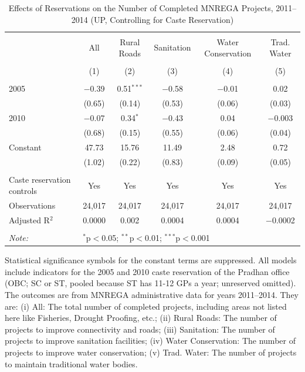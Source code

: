 \begin{table}[!htbp]
\centering
\begin{threeparttable}

  \caption{Effects of Reservations on the Number of Completed MNREGA Projects, 2011--2014 (UP, Controlling for Caste Reservation)} 
  \label{main_mnrega_up_2005_2010_caste_ctrl} 
\scriptsize 
\begin{tabular}{@{\extracolsep{0pt}}lccccc} 
\\[-1.8ex]\hline 
\hline \\[-1.8ex] 
 & All & Rural Roads & Sanitation & Water Conservation & Trad. Water \\ 
\\[-1.8ex] & (1) & (2) & (3) & (4) & (5)\\ 
\hline \\[-1.8ex] 
 2005 & $-$0.39 & 0.51$^{***}$ & $-$0.58 & $-$0.01 & 0.02 \\ 
  & (0.65) & (0.14) & (0.53) & (0.06) & (0.03) \\ 
  2010 & $-$0.07 & 0.34$^{*}$ & $-$0.43 & 0.04 & $-$0.003 \\ 
  & (0.68) & (0.15) & (0.55) & (0.06) & (0.04) \\ 
  Constant & 47.73 & 15.76 & 11.49 & 2.48 & 0.72 \\ 
  & (1.02) & (0.22) & (0.83) & (0.09) & (0.05) \\ 
 \hline \\[-1.8ex] 
Caste reservation controls & Yes & Yes & Yes & Yes & Yes \\ 
Observations & 24,017 & 24,017 & 24,017 & 24,017 & 24,017 \\ 
Adjusted R$^{2}$ & 0.0000 & 0.002 & 0.0004 & 0.0004 & $-$0.0002 \\ 
\hline 
\hline \\[-1.8ex] 
\textit{Note:}  & \multicolumn{5}{l}{$^{*}$p$<$0.05; $^{**}$p$<$0.01; $^{***}$p$<$0.001} \\ 
\end{tabular} 
\begin{tablenotes}[flushleft]
\scriptsize
\item[] Statistical significance symbols for the constant terms are suppressed. All models include indicators for the 2005 and 2010 caste reservation of the Pradhan office (OBC; SC or ST, pooled because ST has 11-12 GPs a year; unreserved omitted). The outcomes are from MNREGA administrative data for years 2011--2014. They are:
(i) All: The total number of completed projects, including areas not listed here
like Fisheries, Drought Proofing, etc.;
(ii) Rural Roads: The number of projects to improve connectivity and roads;
(iii) Sanitation: The number of projects to improve sanitation facilities;
(iv) Water Conservation: The number of projects to improve water conservation;
(v) Trad. Water: The number of projects to maintain traditional water bodies.
\end{tablenotes}
\end{threeparttable}
\end{table}
